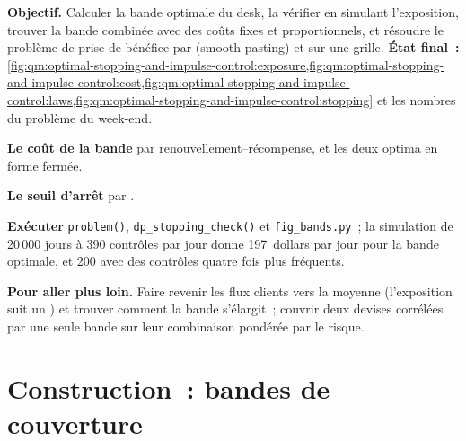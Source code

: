 \begin{tutorial}
\textbf{Objectif.} Calculer la bande optimale du desk, la vérifier en simulant l'exposition, trouver la bande combinée avec des coûts fixes et
proportionnels, et résoudre le problème de prise de bénéfice par  (smooth pasting) et sur une grille. \textbf{État final~:}
\cref{fig:qm:optimal-stopping-and-impulse-control:exposure,fig:qm:optimal-stopping-and-impulse-control:cost,fig:qm:optimal-stopping-and-impulse-control:laws,fig:qm:optimal-stopping-and-impulse-control:stopping}
et les nombres du problème du week-end.
\begin{tutsteps}
\item \textbf{Le coût de la bande} par renouvellement--récompense, et les deux optima en forme fermée.
\label{lst:qm:optimal-stopping-and-impulse-control:band}
\item \textbf{Le seuil d'arrêt} par .
\label{lst:qm:optimal-stopping-and-impulse-control:stop}
\item \textbf{Exécuter} \texttt{problem()}, \texttt{dp\_stopping\_check()} et \texttt{fig\_bands.py}~; la simulation de 20\,000 jours à
390 contrôles par jour donne 197~dollars par jour pour la bande optimale, et 200 avec des contrôles quatre fois plus fréquents.
\end{tutsteps}
\textbf{Pour aller plus loin.} Faire revenir les flux clients vers la moyenne (l'exposition suit un ) et trouver comment la bande
s'élargit~; couvrir deux devises corrélées par une seule bande sur leur combinaison pondérée par le risque.
\end{tutorial}

\section{Construction~: bandes de couverture}\label{bld:qm:optimal-stopping-and-impulse-control:impulse}

